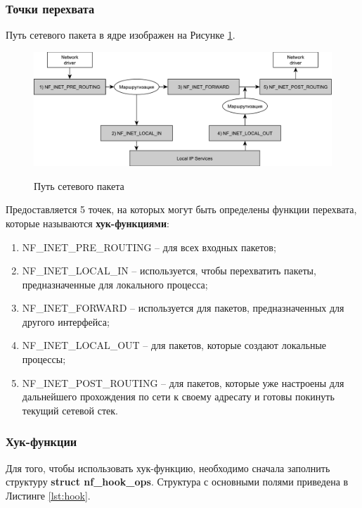 \subsubsection{Точки перехвата}
Путь сетевого пакета в ядре изображен на Рисунке \ref{fig2:image}. \\

\begin{figure}[ph!]
	\centering
	\begin{center}
		{\includegraphics[scale=0.6]{img/packets.pdf}}
		\caption{Путь сетевого пакета}
		\label{fig2:image}
	\end{center}
\end{figure}

Предоставляется 5 точек, на которых могут быть определены функции перехвата, которые называются \textbf{хук-функциями}:
\begin{enumerate}
	\item NF\_INET\_PRE\_ROUTING – для всех входных пакетов;
	\item NF\_INET\_LOCAL\_IN – используется, чтобы перехватить пакеты, предназначенные для локального процесса;
	\item NF\_INET\_FORWARD – используется для пакетов, предназначенных для другого интерфейса;
	\item NF\_INET\_LOCAL\_OUT – для пакетов, которые создают локальные процессы;
	\item NF\_INET\_POST\_ROUTING – для пакетов, которые уже настроены для дальнейшего прохождения по сети к своему адресату и готовы покинуть текущий сетевой стек. \newline
\end{enumerate}

\subsubsection{Хук-функции}
Для того, чтобы использовать хук-функцию, необходимо сначала заполнить структуру \textbf{struct nf\_hook\_ops}. Структура с основными полями приведена в Листинге \ref{lst:hook}.

